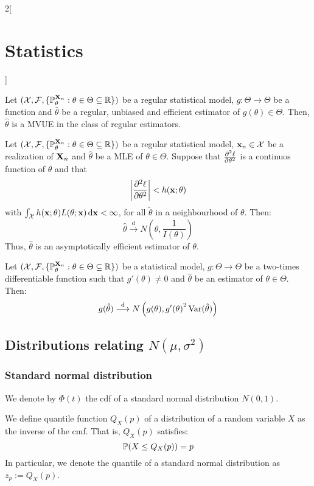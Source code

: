 \documentclass[../../../main.tex]{subfiles}
\begin{document}
\begin{multicols}{2}[\section{Statistics}]
\begin{definition}
  \end{definition}
  \begin{proposition}
    Let $(\mathcal{X},\mathcal{F},\{\mathbb{P}_{\theta}^{\boldsymbol{\mathrm{X}}_n}:\theta\in\Theta\subseteq\mathbb{R}\})$ be a regular statistical model, $g:\Theta\rightarrow\Theta$ be a function and ${\hat\theta}$ be a regular, unbiased and efficient estimator of $g({\theta})\in\Theta$. Then, $\hat\theta$ is a MVUE in the class of regular estimators.
  \end{proposition}
  \begin{theorem}
    Let $(\mathcal{X},\mathcal{F},\{\mathbb{P}_{\theta}^{\boldsymbol{\mathrm{X}}_n}:\theta\in\Theta\subseteq \mathbb{R}\})$ be a regular statistical model, $\boldsymbol{\mathrm{x}}_n\in\mathcal{X}$ be a realization of $\boldsymbol{\mathrm{X}}_n$ and ${\hat\theta}$ be a MLE of ${\theta}\in\Theta$. Suppose that $\pdv[2]{\ell}{\theta}$ is a continuos function of $\theta$ and that $$\left|\pdv[2]{\ell}{\theta}(\tilde{\theta};\boldsymbol{\mathrm{x}}_n)\right|<h(\boldsymbol{\mathrm{x}};\theta)$$
    with $\int_\mathcal{X}h(\boldsymbol{\mathrm{x}};\theta)L(\theta;\boldsymbol{\mathrm{x}})\dd{\boldsymbol{\mathrm{x}}}<\infty$, for all $\tilde{\theta}$ in a neighbourhood of $\theta$. Then:
    $$\hat\theta\overset{\text{d}}{\longrightarrow}N\left(\theta,\frac{1}{I(\theta)}\right)$$
    Thus, ${\hat\theta}$ is an asymptotically efficient estimator of $\theta$.
  \end{theorem}
  \begin{theorem}
    Let $(\mathcal{X},\mathcal{F},\{\mathbb{P}_{\theta}^{\boldsymbol{\mathrm{X}}_n}:\theta\in\Theta\subseteq\mathbb{R}\})$ be a statistical model, $g:\Theta\rightarrow\Theta$ be a two-times differentiable function such that $g'(\theta)\ne 0$ and $\hat\theta$ be an estimator of $\theta\in\Theta$. Then:
    $$g(\hat\theta)\overset{\text{d}}{\longrightarrow}N\left(g(\theta),{g'(\theta)}^2\operatorname{Var}(\hat\theta)\right)$$
  \end{theorem}
  \subsection{Distributions relating \texorpdfstring{$N(\mu,\sigma^2)$}{N(mu,sigma2)}}
  \subsubsection{Standard normal distribution}
  \begin{definition}
    We denote by $\Phi(t)$ the cdf of a standard normal distribution $N(0,1)$.
  \end{definition}
  \begin{definition}[Quantile]
    We define quantile function $Q_X(p)$ of a distribution of a random variable $X$ as the inverse of the cmf. That is, $Q_X(p)$ satisfies:
    $$\mathbb{P}(X\leq Q_X(p))=p$$
    In particular, we denote the quantile of a standard normal distribution as $z_p:=Q_X(p)$.
  \end{definition}

\end{multicols}
\end{document}
